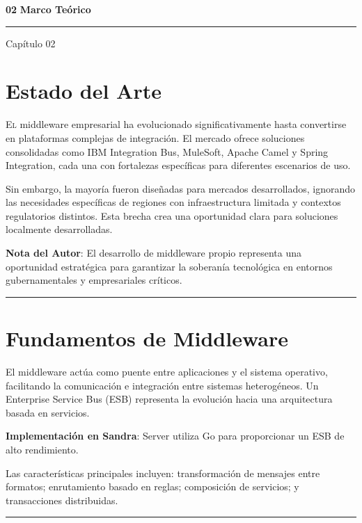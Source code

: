 \documentclass[11pt, spanish, letterpaper, twocolumn, openany]{book}
\newcommand{\separador}{
    \vspace{1.2ex}
    \begin{center}
        \color{sandraTeal}\rule{0.1\linewidth}{0.8pt}
    \end{center}
    \vspace{1.2ex}
}
\newcommand{\chapterpage}[2]{
\thispagestyle{empty}
\begin{minipage}[c][\textheight][c]{\linewidth}
    \begin{center}
        \vspace{0.2\textheight}
        {\fontsize{120}{130}\selectfont\bfseries\color{sandraDark!8}#1}
        \vspace{-3cm}
        {\fontsize{30}{36}\selectfont\bfseries\color{sandraDark}#2}
        \vspace{0.5cm}
        {\color{sandraTeal}\rule{0.12\linewidth}{2pt}}
        \vspace{0.3cm}
        {\fontsize{11}{13}\selectfont\color{sandraGray}Capítulo #1}
    \end{center}
\end{minipage}
\clearpage
}
\begin{document}
\chapterpage{02}{Marco Teórico}

\section{Estado del Arte}

\lettrine{E}{l} middleware empresarial ha evolucionado significativamente hasta convertirse en plataformas complejas de integración. El mercado ofrece soluciones consolidadas como IBM Integration Bus, MuleSoft, Apache Camel y Spring Integration, cada una con fortalezas específicas para diferentes escenarios de uso.

Sin embargo, la mayoría fueron diseñadas para mercados desarrollados, ignorando las necesidades específicas de regiones con infraestructura limitada y contextos regulatorios distintos. Esta brecha crea una oportunidad clara para soluciones localmente desarrolladas.

\begin{notaeditorial}
    \textbf{Nota del Autor}: El desarrollo de middleware propio representa una oportunidad estratégica para garantizar la soberanía tecnológica en entornos gubernamentales y empresariales críticos.
\end{notaeditorial}

\separador

\section{Fundamentos de Middleware}

El middleware actúa como puente entre aplicaciones y el sistema operativo, facilitando la comunicación e integración entre sistemas heterogéneos. Un Enterprise Service Bus (ESB) representa la evolución hacia una arquitectura basada en servicios.

\begin{estandarISO}
    \textbf{Implementación en Sandra}: Server utiliza Go para proporcionar un ESB de alto rendimiento.
\end{estandarISO}

Las características principales incluyen: transformación de mensajes entre formatos; enrutamiento basado en reglas; composición de servicios; y transacciones distribuidas.

\separador
\end{document}
